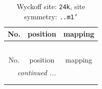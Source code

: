 \documentclass[fleqn,8pt]{jsarticle}
\begin{document}
\renewcommand{\arraystretch}{1.2}
\begin{longtable}{ccc}
\caption{Wyckoff site: {\tt 24k}, site symmetry: {\tt ..m1'}}
 \\
 \hline \hline
No. & position & mapping \\ \hline \endfirsthead

\multicolumn{2}{l}{\tablename\ \thetable{}} \\
 \hline \hline
No. & position & mapping \\ \hline \endhead

 \hline \hline
\multicolumn{2}{r}{\footnotesize\it continued ...} \\ \endfoot

 \hline \hline
\multicolumn{2}{r}{} \\ \endlastfoot


\end{longtable}
\end{document}
